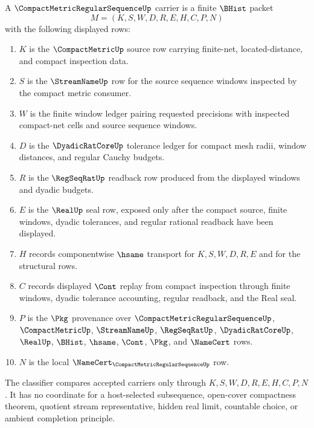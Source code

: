 \begin{definition}
\label{def:compact-metric-regular-sequence-carrier}
A $\CompactMetricRegularSequenceUp$ carrier is a finite $\BHist$ packet
$$
M=(K,S,W,D,R,E,H,C,P,N)
$$
with the following displayed rows:
\begin{enumerate}
\item $K$ is the $\CompactMetricUp$ source row carrying finite-net, located-distance, and compact inspection data.
\item $S$ is the $\StreamNameUp$ row for the source sequence windows inspected by the compact metric consumer.
\item $W$ is the finite window ledger pairing requested precisions with inspected compact-net cells and source sequence windows.
\item $D$ is the $\DyadicRatCoreUp$ tolerance ledger for compact mesh radii, window distances, and regular Cauchy budgets.
\item $R$ is the $\RegSeqRatUp$ readback row produced from the displayed windows and dyadic budgets.
\item $E$ is the $\RealUp$ seal row, exposed only after the compact source, finite windows, dyadic tolerances, and regular rational readback have been displayed.
\item $H$ records componentwise $\hsame$ transport for $K,S,W,D,R,E$ and for the structural rows.
\item $C$ records displayed $\Cont$ replay from compact inspection through finite windows, dyadic tolerance accounting, regular readback, and the Real seal.
\item $P$ is the $\Pkg$ provenance over $\CompactMetricRegularSequenceUp$, $\CompactMetricUp$, $\StreamNameUp$, $\RegSeqRatUp$, $\DyadicRatCoreUp$, $\RealUp$, $\BHist$, $\hsame$, $\Cont$, $\Pkg$, and $\NameCert$ rows.
\item $N$ is the local $\NameCert_{\CompactMetricRegularSequenceUp}$ row.
\end{enumerate}
The classifier compares accepted carriers only through $K,S,W,D,R,E,H,C,P,N$. It has no coordinate for a host-selected subsequence, open-cover compactness theorem, quotient stream representative, hidden real limit, countable choice, or ambient completion principle.
\end{definition}

